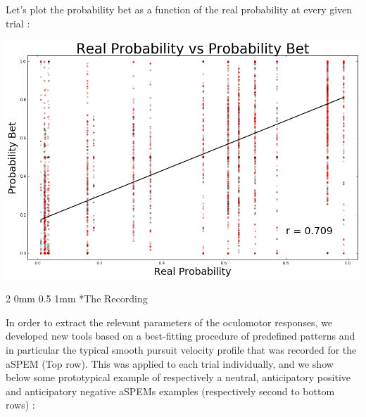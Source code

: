 \documentclass[profile,final,english, draft]{sciposter}%
\makeatletter
\renewcommand{\subsection}{\@startsection
        {subsection}%
        {2}%
        {0mm}%
        {0.5\baselineskip}%
        {1mm}%
        {\normalsize\color[rgb]{0.4,0,0}\bfseries}}%
\makeatother
\begin{document}
\begin{multicols}{3}
Let's plot the probability bet as a function of the real probability at every given trial :

\begin{center}
    \includegraphics[width=1\columnwidth]{p_true--p_parie}
\end{center}


\subsection*{The Recording}

In order to extract the relevant parameters of the oculomotor responses, we developed new tools based on a best-fitting procedure of predefined patterns and in particular the typical smooth pursuit velocity profile that was recorded for the aSPEM (Top row). This was applied to each trial individually, and we show below some prototypical example of respectively a neutral, anticipatory positive and anticipatory negative aSPEMs examples (respectively second to bottom rows) :


\end{multicols}
\end{document}
